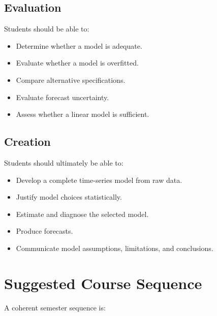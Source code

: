 \documentclass[11pt,a4paper]{article}
\begin{document}
\subsection{Evaluation}

Students should be able to:

\begin{itemize}
    \item Determine whether a model is adequate.
    \item Evaluate whether a model is overfitted.
    \item Compare alternative specifications.
    \item Evaluate forecast uncertainty.
    \item Assess whether a linear model is sufficient.
\end{itemize}

\subsection{Creation}

Students should ultimately be able to:

\begin{itemize}
    \item Develop a complete time-series model from raw data.
    \item Justify model choices statistically.
    \item Estimate and diagnose the selected model.
    \item Produce forecasts.
    \item Communicate model assumptions, limitations, and conclusions.
\end{itemize}

\section{Suggested Course Sequence}

A coherent semester sequence is:
\end{document}
